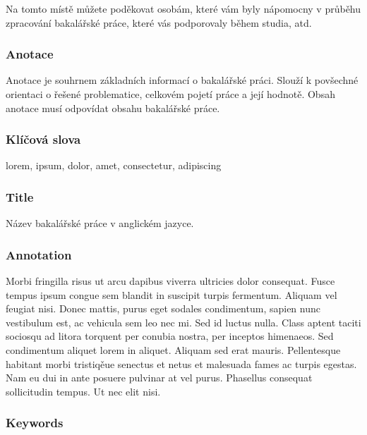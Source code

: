 \documentclass[11pt,a4paper,fleqn,titlepage,twoside,openany]{book}
\begin{document}
Na tomto místě můžete poděkovat osobám, které vám byly nápomocny v průběhu zpracování bakalářské práce, které vás podporovaly během studia, atd.

\newpage 
\thispagestyle{empty}
\subsubsection*{Anotace}

Anotace je souhrnem základních informací o bakalářské práci. Slouží k povšechné orientaci o řešené problematice, celkovém pojetí práce a její hodnotě. Obsah anotace musí odpovídat obsahu bakalářské práce.

\vspace*{0.8cm}\subsubsection*{Klíčová slova}

lorem, ipsum, dolor, amet, consectetur, adipiscing 

\vspace*{2.8cm}\subsubsection*{Title}
Název bakalářské práce v anglickém jazyce.

\vspace*{0.8cm}\subsubsection*{Annotation}

Morbi fringilla risus ut arcu dapibus viverra ultricies dolor consequat. Fusce tempus ipsum congue sem blandit in suscipit turpis fermentum. Aliquam vel feugiat nisi. Donec mattis, purus eget sodales condimentum, sapien nunc vestibulum est, ac vehicula sem leo nec mi. Sed id luctus nulla. Class aptent taciti sociosqu ad litora torquent per conubia nostra, per inceptos himenaeos. Sed condimentum aliquet lorem in aliquet. Aliquam sed erat mauris. Pellentesque habitant morbi tristiqěue senectus et netus et malesuada fames ac turpis egestas. Nam eu dui in ante posuere pulvinar at vel purus. Phasellus consequat sollicitudin tempus. Ut nec elit nisi. 

\vspace*{0.8cm}\subsubsection*{Keywords}
\end{document}
